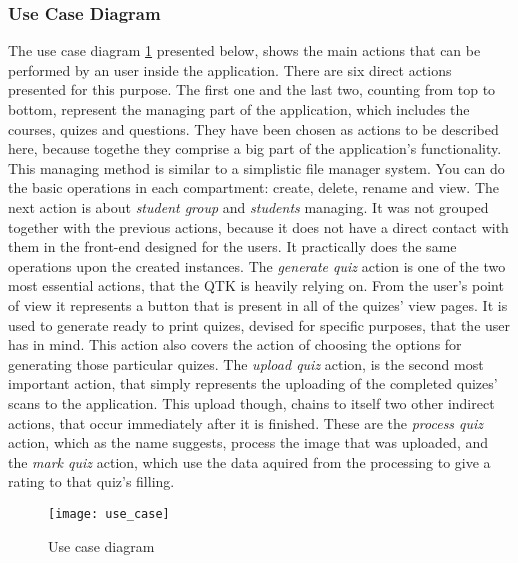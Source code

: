 \subsubsection{Use Case Diagram}
The use case diagram \ref{use_case_diagram} presented below, shows the main actions that can be performed by an user inside the application. There are six direct actions presented for this purpose. The first one and the last two, counting from top to bottom, represent the managing part of the application, which includes the courses, quizes and questions. They have been chosen as actions to be described here, because togethe they comprise a big part of the application's functionality. This managing method is similar to a simplistic file manager system. You can do the basic operations in each compartment: create, delete, rename and view. The next action is about \textit{student group} and \textit{students} managing. It was not grouped together with the previous actions, because it does not have a direct contact with them in the front-end designed for the users. It practically does the same operations upon the created instances. The \textit{generate quiz} action is one of the two most essential actions, that the QTK is heavily relying on. From the user's point of view it represents a button that is present in all of the quizes' view pages. It is used to generate ready to print quizes, devised for specific purposes, that the user has in mind. This action also covers the action of choosing the options for generating those particular quizes. The \textit{upload quiz} action, is the second most important action, that simply represents the uploading of the completed quizes' scans to the application. This upload though, chains to itself two other indirect actions, that occur immediately after it is finished. These are the \textit{process quiz} action, which as the name suggests, process the image that was uploaded, and the \textit{mark quiz} action, which use the data aquired from the processing to give a rating to that quiz's filling.

\begin{figure}[!ht]
\centering
\texttt{[image: use\_case]}
\caption{Use case diagram} \label{use_case_diagram}
\end{figure}

